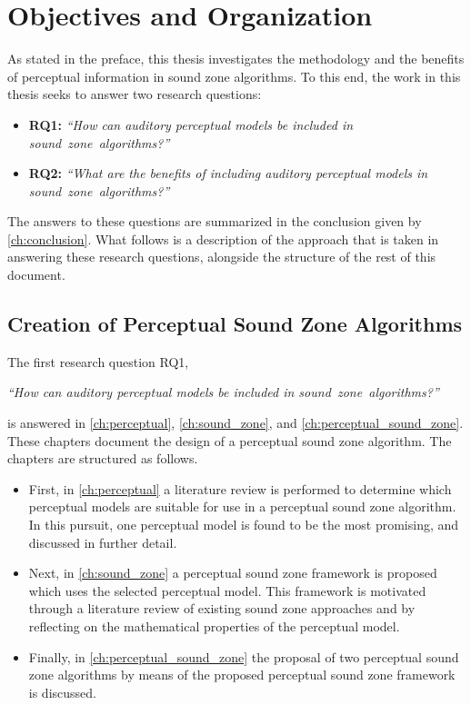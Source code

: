 \section{Objectives and Organization}
\label{ch:introduction:objectives}
As stated in the preface, this thesis investigates the methodology and 
the benefits of perceptual information in sound zone algorithms.
To this end, the work in this thesis seeks to answer two research questions:
\begin{itemize}
    \item \textbf{RQ1:} {\textit{``How can auditory perceptual models be included in sound~zone~algorithms?''}}
    \item \textbf{RQ2:} {\textit{``What are the benefits of including auditory perceptual models in sound~zone~algorithms?''}}
\end{itemize}

The answers to these questions are summarized in the conclusion given by \autoref{ch:conclusion}. 
What follows is a description of the approach that is taken in answering these research questions, 
alongside the structure of the rest of this document.

\subsection{Creation of Perceptual Sound Zone Algorithms}
The first research question RQ1, 

\begin{center}
    {\textit{``How can auditory perceptual models be included in sound~zone~algorithms?''}}
\end{center}

is answered in \autoref{ch:perceptual}, \autoref{ch:sound_zone}, and \autoref{ch:perceptual_sound_zone}.
These chapters document the design of a perceptual sound zone algorithm.
The chapters are structured as follows.
\begin{itemize}
    \item First, in \autoref{ch:perceptual} a literature review is performed to determine which perceptual models are 
        suitable for use in a perceptual sound zone algorithm.
        In this pursuit, one perceptual model is found to be the most promising, and discussed in further detail.
    \item Next, in \autoref{ch:sound_zone} a perceptual sound zone framework is proposed which uses the selected perceptual model.
        This framework is motivated through a literature review of existing sound zone approaches 
        and by reflecting on the mathematical properties of the perceptual model.
    \item Finally, in \autoref{ch:perceptual_sound_zone} the proposal of two perceptual sound zone algorithms 
        by means of the proposed perceptual sound zone framework is discussed.
\end{itemize}

